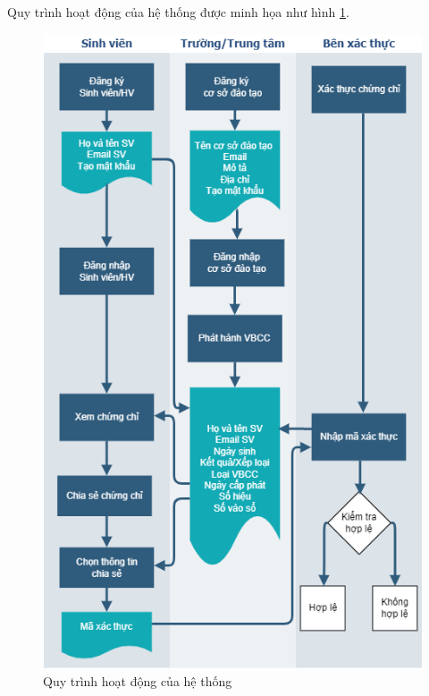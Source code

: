 Quy trình hoạt động của hệ thống được minh họa như hình \ref{fig:vbcc_diagram}.

\begin{figure}[htbp]
\centering
\includegraphics[width=.8\linewidth]{img/vbcc_diagram2.png}
\caption{Quy trình hoạt động của hệ thống}
\label{fig:vbcc_diagram}
\end{figure}

